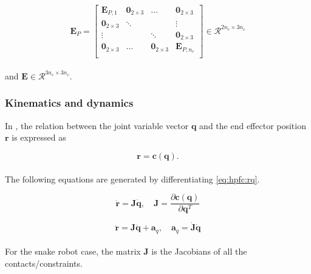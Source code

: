\begin{equation}
    \mathbf{E}_P = 
    \begin{bmatrix}
        \mathbf{E}_{P,1} & \mathbf{0}_{2\times3} & \dots & \mathbf{0}_{2\times3} \\
        \mathbf{0}_{2\times3} & \ddots & & \vdots \\
        \vdots & & \ddots & \mathbf{0}_{2\times3} \\
        \mathbf{0}_{2\times3} & \dots & \mathbf{0}_{2\times3} & \mathbf{E}_{P,n_c} \\
    \end{bmatrix} \in \mathcal{R}^{2 n_c \times 3 n_c}
\end{equation}
\\
and $\mathbf{E} \in \mathcal{R}^{3 n_c \times 3 n_c}$.


\subsubsection{Kinematics and dynamics}

In \cite{yoshikawa1987dynamic}, the relation between the joint variable vector $\mathbf{q}$ and the end effector position $\mathbf{r}$ is expressed as

\begin{equation}\label{eq:hpfc:rq}
    \mathbf{r = c(q)}.
\end{equation}
\\
The following equations are generated by differentiating \ref{eq:hpfc:rq}.

\begin{equation}
    \mathbf{\dot{r} = J \dot{q}}, \quad \mathbf{J} = \frac{\partial \mathbf{c(q)}}{\partial \mathbf{q}^T}
\end{equation}

\begin{equation}\label{eq:dhpfc_aq}
    \mathbf{\ddot{r} = J \ddot{q}} + \mathbf{a}_q, \quad \mathbf{a}_q = \mathbf{\dot{J} \dot{q}}   
\end{equation}
\\
For the snake robot case, the matrix $\mathbf{J}$ is the Jacobians of all the contacts/constraints.


